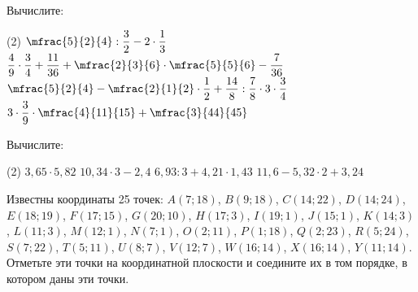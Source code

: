 \begin{homework}[number=3]
	\begin{listofex}
		\item Вычислите: 
		\begin{tasks}(2)
			\task \( \mfrac{5}{2}{4}:\dfrac{3}{2}-2\cdot\dfrac{1}{3} \)
			\task \( \dfrac{4}{9}\cdot\dfrac{3}{4}+\dfrac{11}{36}+\mfrac{2}{3}{6}\cdot\mfrac{5}{5}{6} -\dfrac{7}{36}\)
			\task \( \mfrac{5}{2}{4}-\mfrac{2}{1}{2}\cdot\dfrac{1}{2}+\dfrac{14}{8}:\dfrac{7}{8}\cdot3\cdot\dfrac{3}{4}\)
			\task \( 3\cdot\dfrac{3}{9}\cdot\mfrac{4}{11}{15}+\mfrac{3}{44}{45} \)
		\end{tasks}
		\item Вычислите: 
		\begin{tasks}(2)
			\task \( 3,65\cdot5,82 \)
			\task \( 10,34\cdot3-2,4 \)
			\task \( 6,93:3+4,21\cdot1,43 \)
			\task \( 11,6-5,32\cdot2+3,24 \)
		\end{tasks}
		\item Известны координаты 25 точек:
		\( A(7;18) \), \( B(9;18) \), \( C(14;22) \), \( D(14;24) \), \( E(18;19) \), \( F(17;15) \), \( G(20;10) \), \( H(17;3) \), \( I(19;1) \), \( J(15;1) \), \( K(14;3) \), \( L(11;3) \), \( M(12;1) \), \( N(7;1) \), \( O(2;11) \), \( P(1;18) \), \( Q(2;23) \), \( R(5;24) \), \( S(7;22) \), \( T(5;11) \), \( U(8;7) \), \( V(12;7) \), \( W(16;14) \), \( X(16;14) \), \( Y(11;14) \). Отметьте эти точки на координатной плоскости и соедините их в том порядке, в котором даны эти точки.
		
	\end{listofex}
\end{homework}

